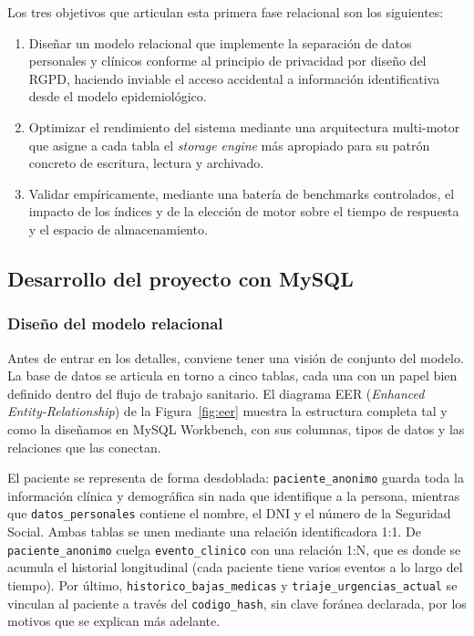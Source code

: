 \documentclass[../main.tex]{subfiles}
\begin{document}
Los tres objetivos que articulan esta primera fase relacional son los siguientes:

\begin{enumerate}
    \item Diseñar un modelo relacional que implemente la separación de datos personales y clínicos conforme al principio de privacidad por diseño del RGPD, haciendo inviable el acceso accidental a información identificativa desde el modelo epidemiológico.
    \item Optimizar el rendimiento del sistema mediante una arquitectura multi-motor que asigne a cada tabla el \textit{storage engine} más apropiado para su patrón concreto de escritura, lectura y archivado.
    \item Validar empíricamente, mediante una batería de benchmarks controlados, el impacto de los índices y de la elección de motor sobre el tiempo de respuesta y el espacio de almacenamiento.
\end{enumerate}

\subsection{Desarrollo del proyecto con MySQL}

\subsubsection{Diseño del modelo relacional}

Antes de entrar en los detalles, conviene tener una visión de conjunto del modelo. La base de datos se articula en torno a cinco tablas, cada una con un papel bien definido dentro del flujo de trabajo sanitario. El diagrama EER (\textit{Enhanced Entity-Relationship}) de la Figura~\ref{fig:eer} muestra la estructura completa tal y como la diseñamos en MySQL Workbench, con sus columnas, tipos de datos y las relaciones que las conectan.

El paciente se representa de forma desdoblada: \texttt{paciente\_anonimo} guarda toda la información clínica y demográfica sin nada que identifique a la persona, mientras que \texttt{datos\_personales} contiene el nombre, el DNI y el número de la Seguridad Social. Ambas tablas se unen mediante una relación identificadora 1:1. De \texttt{paciente\_anonimo} cuelga \texttt{evento\_clinico} con una relación 1:N, que es donde se acumula el historial longitudinal (cada paciente tiene varios eventos a lo largo del tiempo). Por último, \texttt{historico\_bajas\_medicas} y \texttt{triaje\_urgencias\_actual} se vinculan al paciente a través del \texttt{codigo\_hash}, sin clave foránea declarada, por los motivos que se explican más adelante.
\end{document}
